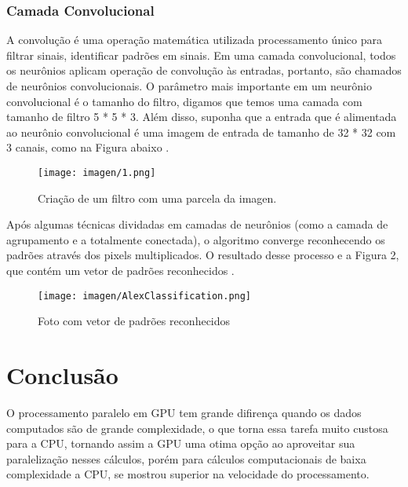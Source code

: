 \documentclass[conference]{IEEEtran}
\begin{document}
	\subsubsection{Camada Convolucional}
	A convolução é uma operação matemática utilizada processamento único para filtrar sinais, identificar padrões em sinais. Em uma camada convolucional, todos os neurônios aplicam operação de convolução às entradas, portanto, são chamados de neurônios convolucionais. O parâmetro mais importante em um neurônio convolucional é o tamanho do filtro, digamos que temos uma camada com tamanho de filtro 5 * 5 * 3. Além disso, suponha que a entrada que é alimentada ao neurônio convolucional é uma imagem de entrada de tamanho de 32 * 32 com 3 canais, como na Figura abaixo \cite{IEEEhowto:4}. 
	
	\begin{figure}[H]
		\centering
		\texttt{[image: imagen/1.png]}
		
		\caption{Criação de um filtro com uma parcela da imagen.}
		\label{figRotulo}
	\end{figure}
	Após algumas técnicas dividadas em camadas de neurônios (como a camada de agrupamento e a totalmente conectada), o algoritmo converge reconhecendo os padrões através dos pixels multiplicados.
	O resultado desse processo e a Figura 2, que contém um vetor de padrões reconhecidos \cite{IEEEhowto:3}.

	 \begin{figure}[H]
		\centering
		\texttt{[image: imagen/AlexClassification.png]}
		
		\caption{Foto com vetor de padrões reconhecidos}
		\label{figRotulo}
	\end{figure}
	\section*{Conclus\~ao}
	O processamento paralelo em GPU tem grande difiren\c{c}a quando os dados computados s\~ao de grande complexidade, o que torna essa tarefa muito custosa para a CPU, tornando assim a GPU uma otima opção ao aproveitar sua paralelização  nesses c\'alculos, por\'em para c\'alculos computacionais de baixa complexidade a CPU, se mostrou superior na velocidade do processamento.
	
\end{document}
